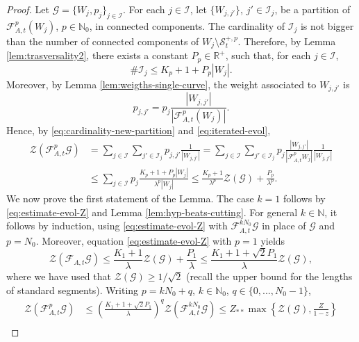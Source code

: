 \documentclass[10pt,a4paper]{amsart}
\newcommand\bN{{\mathbb N}}
\newcommand\bR{{\mathbb R}}
\newcommand\cF{{\mathcal F}}
\newcommand\cG{{\mathcal G}}
\newcommand\cI{{\mathcal I}}
\newcommand\cS{{\mathcal S}}
\newcommand\cZ{{\mathcal Z}}
\newcommand{\catt}{\cF_{A,t}}
\renewcommand{\ge}{\geqslant}
\renewcommand{\le}{\leqslant}
\begin{document}
\begin{proof}
 Let \(\cG = \{W_j, p_j\}_{j \in \cI}\). For each \(j \in \cI\), let \(\{W_{j,j'}\}\), \(j' \in \cI_j\), be a partition of \(\catt^{p}(W_j)\), \(p \in \bN_0\), in connected components. The cardinality of \(\cI_j\) is not bigger than the number of connected components of \(W_j \setminus \cS^{+,p}_t\). Therefore, by Lemma \ref{lem:trasversality2}, there exists a constant \(P_{p} \in \bR^+\), such that, for each \(j \in \cI\),
\begin{equation}\label{eq:cardinality-new-partition}
  \# \cI_j \le K_{p} + 1 + P_{p}|W_j|.
\end{equation}
Moreover, by Lemma \ref{lem:weigths-single-curve}, the weight associated to \(W_{j,j'}\) is
\begin{equation}\label{eq:iterated-evol}
p_{j,j'} = p_j \frac{|W_{j,j'}|}{|\catt^p(W_j)|}.
\end{equation}
Hence, by \eqref{eq:cardinality-new-partition} and \eqref{eq:iterated-evol},
\begin{equation}\label{eq:estimate-evol-Z}
\begin{split}
  \cZ(\catt^{p}\cG) &= \sum_{j \in \cI}\sum_{j' \in \cI_{j}} p_{j,j'} \frac{1}{|W_{j,j'}|}= \sum_{j \in \cI}\sum_{j' \in \cI_{j}}p_j\frac{|W_{j,j'}|}{|\catt^{p} W_j|}\frac{1}{|W_{j,j'}|} \\
  &\le \sum_{j \in \cI}p_j\frac{K_{p} +1 +P_{p}|W_j|}{\lambda^{p}|W_j|}\le \frac{K_{p} + 1}{\lambda^{p}}\cZ(\cG) + \frac{P_{p}}{\lambda^{p}}.
\end{split}
\end{equation}
We now prove the first statement of the Lemma. The case \(k = 1\) follows by \eqref{eq:estimate-evol-Z} and Lemma \ref{lem:hyp-beats-cutting}. For general \(k \in \bN\), it follows by induction, using \eqref{eq:estimate-evol-Z} with  \(\catt^{k N_0} \cG\) in place of \(\cG\) and \(p = N_0\). Moreover, equation \eqref{eq:estimate-evol-Z} with \(p = 1\) yields
\begin{equation}\label{eq:bad-estimate}
  \cZ \left(\catt \cG\right) \le\frac{K_{1} + 1}{\lambda}\cZ(\cG) + \frac{P_{1}}{\lambda} \le\frac{K_1 + 1+ \sqrt{2} P_1}{\lambda} \cZ(\cG),
\end{equation}
where we have used that \(\cZ(\cG) \ge 1/\sqrt{2}\) (recall the upper bound for the lengths of standard segments). Writing \(p = kN_0 + q\), \(k \in \bN_0\), \(q \in \{0,...,N_0-1\}\),
\begin{equation}\label{eq:growth-eq-proof}
\begin{split}
\cZ(\catt^p \cG) &\le \left( \frac{K_1 + 1+ \sqrt{2}P_1}{\lambda}\right)^q \cZ(\catt^{kN_0}\cG) \le Z_{**} \max\left\{\cZ(\cG), \frac{Z}{1-z}\right\} \\

\end{split}
\end{equation}
\end{proof}
\end{document}
